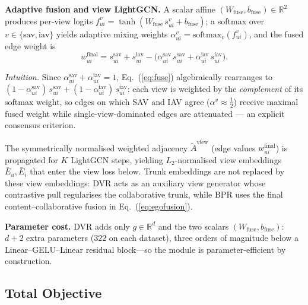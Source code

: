 \documentclass[conference]{IEEEtran}
\newcommand{\dvr}{DVR\xspace}
\begin{document}
\noindent\textbf{Adaptive fusion and view LightGCN.} A scalar affine
$(W_{\text{fuse}}, b_{\text{fuse}}) \in \mathbb{R}^{2}$ produces
per-view logits
$f^{v}_{ui} = \tanh(W_{\text{fuse}}\, s^{v}_{ui} + b_{\text{fuse}})$;
a softmax over $v\in\{\text{sav},\text{iav}\}$ yields adaptive mixing
weights $\alpha^{v}_{ui} = \mathrm{softmax}_{v}(f^{v}_{ui})$, and the
fused edge weight is
\begin{equation}
w^{\text{final}}_{ui} = s^{\text{sav}}_{ui} + s^{\text{iav}}_{ui}
    - \big(\alpha^{\text{sav}}_{ui}\, s^{\text{sav}}_{ui}
       + \alpha^{\text{iav}}_{ui}\, s^{\text{iav}}_{ui}\big).
\label{eq:fuse}
\end{equation}

\noindent\emph{Intuition.} Since
$\alpha^{\text{sav}}_{ui}+\alpha^{\text{iav}}_{ui}=1$,
Eq.~(\ref{eq:fuse}) algebraically rearranges to
$(1{-}\alpha^{\text{sav}}_{ui})\,s^{\text{sav}}_{ui}
 +(1{-}\alpha^{\text{iav}}_{ui})\,s^{\text{iav}}_{ui}$: each view is
weighted by the \emph{complement} of its softmax weight, so edges on
which SAV and IAV agree ($\alpha^{v}{\approx}\tfrac{1}{2}$) receive
maximal fused weight while single-view-dominated edges are
attenuated --- an explicit consensus criterion.

The symmetrically normalised weighted adjacency $\tilde A^{\text{view}}$
(edge values $w^{\text{final}}_{ui}$) is propagated for $K$
LightGCN steps, yielding $L_2$-normalised view embeddings
$\bar E_u,\bar E_i$ that enter the view loss below. Trunk embeddings
are not replaced by these view embeddings: \dvr acts as an auxiliary
view generator whose contrastive pull regularises the collaborative
trunk, while BPR uses the final content--collaborative fusion in
Eq.~(\ref{eq:egofusion}).

\noindent\textbf{Parameter cost.} \dvr adds only
$g\in\mathbb{R}^{d}$ and the two scalars
$(W_{\text{fuse}}, b_{\text{fuse}})$: $d{+}2$ extra parameters
($322$ on each dataset), three orders of magnitude below a
Linear--GELU--Linear residual block---so the module is
parameter-efficient by construction.

\subsection{Total Objective}
\label{sec:totalloss}
\end{document}
